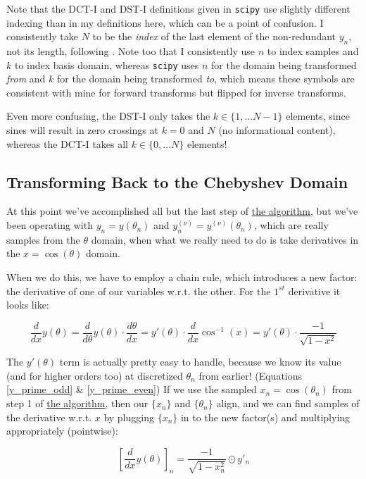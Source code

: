 \documentclass[10pt]{article}
\begin{document}
Note that the DCT-I and DST-I definitions given in \texttt{scipy}\cite{dct}\cite{dst} use slightly different indexing than in my definitions here, which can be a point of confusion. I consistently take $N$ to be the \textit{index} of the last element of the non-redundant $y_n$, not its length, following \cite{trefethen8}. Note too that I consistently use $n$ to index samples and $k$ to index basis domain, whereas \texttt{scipy} uses $n$ for the domain being transformed \textit{from} and $k$ for the domain being transformed \textit{to}, which means these symbols are consistent with mine for forward transforms but flipped for inverse transforms.

Even more confusing, the DST-I only takes the $k \in \{1, ... N-1\}$ elements, since sines will result in zero crossings at $k = 0$ and $N$ (no informational content), whereas the DCT-I takes all $k \in \{0, ... N\}$ elements!

\subsection{Transforming Back to the Chebyshev Domain}

At this point we've accomplished all but the last step of \hyperref[algo]{the algorithm}, but we've been operating with $y_n = y(\theta_n)$ and $y_n^{(\nu)} = y^{(\nu)}(\theta_n)$, which are really samples from the $\theta$ domain, when what we really need to do is take derivatives in the $x = \cos(\theta)$ domain.

When we do this, we have to employ a chain rule, which introduces a new factor: the derivative of one of our variables w.r.t. the other. For the $1^{st}$ derivative it looks like:

$$\frac{d}{dx} y(\theta) = \frac{d}{d\theta} y(\theta) \cdot \frac{d\theta}{dx} = y'(\theta) \cdot \frac{d}{dx} \cos^{-1}(x) = y'(\theta) \cdot \frac{-1}{\sqrt{1 - x^2}}$$

The $y'(\theta)$ term is actually pretty easy to handle, because we know its value (and for higher orders too) at discretized $\theta_n$ from earlier! (Equations \ref{y_prime_odd} \& \ref{y_prime_even}) If we use the sampled $x_n = \cos(\theta_n)$ from step 1 of \hyperref[algo]{the algorithm}, then our $\{x_n\}$ and $\{\theta_n\}$ align, and we can find samples of the derivative w.r.t. $x$ by plugging $\{x_n\}$ in to the new factor(s) and multiplying appropriately (pointwise):

$$[\frac{d}{dx} y(\theta)]_n = \frac{-1}{\sqrt{1 - x_n^2}} \odot y'_n$$
\end{document}
